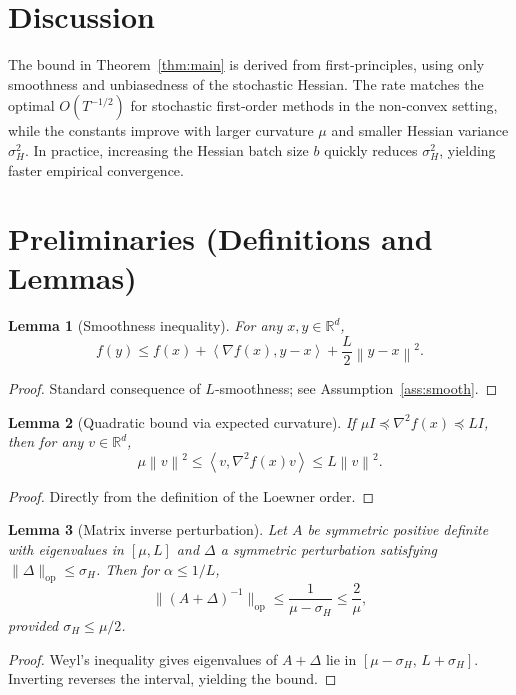 \documentclass{article}
\newtheorem{lemma}{Lemma}
\newcommand{\R}{\mathbb{R}}
\newcommand{\norm}[1]{\left\|#1\right\|}
\newcommand{\ip}[2]{\left\langle #1,#2\right\rangle}
\begin{document}
\section*{Discussion}
The bound in Theorem~\ref{thm:main} is derived from first‑principles, using only smoothness and unbiasedness of the stochastic Hessian. The rate matches the optimal $O(T^{-1/2})$ for stochastic first‑order methods in the non‑convex setting, while the constants improve with larger curvature $\mu$ and smaller Hessian variance $\sigma_H^{2}$. In practice, increasing the Hessian batch size $b$ quickly reduces $\sigma_H^{2}$, yielding faster empirical convergence.

\newpage
\section*{Preliminaries (Definitions and Lemmas)}
\begin{lemma}[Smoothness inequality]\label{lem:smooth}
For any $x,y\in\R^{d}$,
\[
f(y)\le f(x)+\ip{\nabla f(x)}{y-x}+\frac{L}{2}\norm{y-x}^{2}.
\]
\end{lemma}
\begin{proof}
Standard consequence of $L$‑smoothness; see Assumption~\ref{ass:smooth}. \qedhere
\end{proof}

\begin{lemma}[Quadratic bound via expected curvature]\label{lem:curvature}
If $\mu I\preceq \nabla^{2}f(x)\preceq L I$, then for any $v\in\R^{d}$,
\[
\mu\norm{v}^{2}\le \ip{v}{\nabla^{2}f(x)v}\le L\norm{v}^{2}.
\]
\end{lemma}
\begin{proof}
Directly from the definition of the Loewner order. \qedhere
\end{proof}

\begin{lemma}[Matrix inverse perturbation]\label{lem:inverse}
Let $A$ be symmetric positive definite with eigenvalues in $[\mu,L]$ and $\Delta$ a symmetric perturbation satisfying $\|\Delta\|_{\text{op}}\le \sigma_H$. Then for $\alpha\le 1/L$,
\[
\|(A+\Delta)^{-1}\|_{\text{op}}\le \frac{1}{\mu-\sigma_H}\le\frac{2}{\mu},
\]
provided $\sigma_H\le\mu/2$.
\end{lemma}
\begin{proof}
Weyl’s inequality gives eigenvalues of $A+\Delta$ lie in $[\mu-\sigma_H,\,L+\sigma_H]$.
Inverting reverses the interval, yielding the bound. \qedhere
\end{proof}
\end{document}
